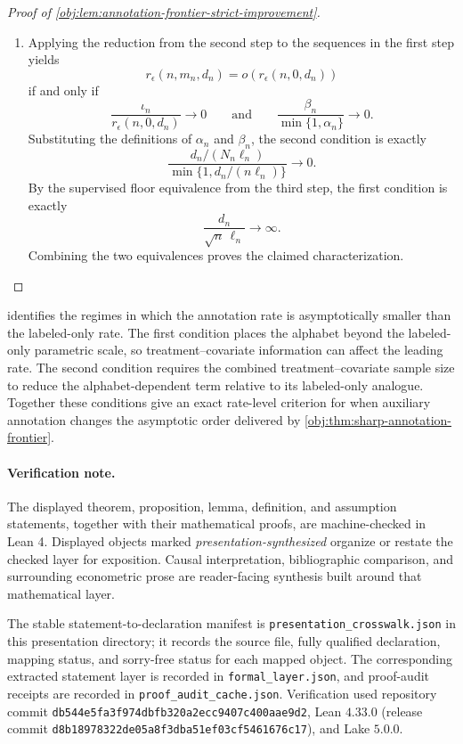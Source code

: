 \documentclass[11pt]{article}
\begin{document}
\begin{proof}[Proof of \cref{obj:lem:annotation-frontier-strict-improvement}]
\begin{enumerate}
\item
Applying the reduction from the second step to the sequences in the first step yields
\[
r_\epsilon(n,m_n,d_n)=o\!\left(r_\epsilon(n,0,d_n)\right)
\]
if and only if
\[
\frac{\iota_n}{r_\epsilon(n,0,d_n)}\to0
\qquad\text{and}\qquad
\frac{\beta_n}{\min\{1,\alpha_n\}}\to0.
\]
Substituting the definitions of \(\alpha_n\) and \(\beta_n\), the second condition is exactly
\[
\frac{d_n/(N_n\ell_n)}
{\min\{1,d_n/(n\ell_n)\}}
\to0.
\]
By the supervised floor equivalence from the third step, the first condition is exactly
\[
\frac{d_n}{\sqrt n\,\ell_n}\to\infty.
\]
Combining the two equivalences proves the claimed characterization.
\end{enumerate}
\end{proof}

 identifies the regimes in which the annotation rate is asymptotically smaller than the labeled-only rate. The first condition places the alphabet beyond the labeled-only parametric scale, so treatment--covariate information can affect the leading rate. The second condition requires the combined treatment--covariate sample size to reduce the alphabet-dependent term relative to its labeled-only analogue. Together these conditions give an exact rate-level criterion for when auxiliary annotation changes the asymptotic order delivered by \cref{obj:thm:sharp-annotation-frontier}.

\paragraph{Verification note.}
The displayed theorem, proposition, lemma, definition, and assumption statements, together with their mathematical proofs, are machine-checked in Lean 4. Displayed objects marked \emph{presentation-synthesized} organize or restate the checked layer for exposition. Causal interpretation, bibliographic comparison, and surrounding econometric prose are reader-facing synthesis built around that mathematical layer.

The stable statement-to-declaration manifest is
\texttt{presentation\_crosswalk.json} in this presentation directory; it records the source file, fully qualified declaration, mapping status, and sorry-free status for each mapped object. The corresponding extracted statement layer is recorded in \texttt{formal\_layer.json}, and proof-audit receipts are recorded in \texttt{proof\_audit\_cache.json}. Verification used repository commit
\texttt{db544e5fa3f974dbfb320a2ecc9407c400aae9d2}, Lean \(4.33.0\) (release commit \texttt{d8b18978322de05a8f3dba51ef03cf5461676c17}), and Lake \(5.0.0\).
\end{document}
